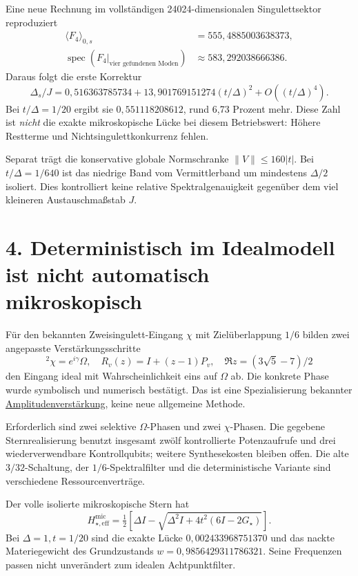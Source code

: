 \documentclass[11pt,a4paper,oneside,parskip=half,headings=normal]{scrreprt}
\newcommand{\spec}{\operatorname{spec}}
\begin{document}
Eine neue Rechnung im vollständigen 24024-dimensionalen Singulettsektor reproduziert
\begin{align}
\langle F_4\rangle_{0,s}&=555{,}4885003638373,\\
\spec(F_4|_{\text{vier gefundenen Moden}})
&\approx583{,}292038666386.
\end{align}
Daraus folgt die erste Korrektur
\begin{equation}
\Delta_s/J=0{,}516363785734+
13{,}901769151274(t/\Delta)^2+O((t/\Delta)^4).
\end{equation}
Bei $t/\Delta=1/20$ ergibt sie $0{,}551118208612$, rund 6,73 Prozent mehr. Diese Zahl ist \emph{nicht} die exakte mikroskopische Lücke bei diesem Betriebswert: Höhere Restterme und Nichtsingulettkonkurrenz fehlen.

Separat trägt die konservative globale Normschranke $\|V\|\le160|t|$. Bei $t/\Delta=1/640$ ist das niedrige Band vom Vermittlerband um mindestens $\Delta/2$ isoliert. Dies kontrolliert keine relative Spektralgenauigkeit gegenüber dem viel kleineren Austauschmaßstab $J$.

\section*{4. Deterministisch im Idealmodell ist nicht automatisch mikroskopisch}
Für den bekannten Zweisingulett-Eingang $\chi$ mit Zielüberlappung $1/6$ bilden zwei angepasste Verstärkungsschritte
\begin{equation}
[R_\chi(z)R_\Omega(z)]^2\chi=e^{i\gamma}\Omega,\quad
R_v(z)=I+(z-1)P_v,\quad \Re z=(3\sqrt5-7)/2
\end{equation}
den Eingang ideal mit Wahrscheinlichkeit eins auf $\Omega$ ab. Die konkrete Phase wurde symbolisch und numerisch bestätigt. Das ist eine Spezialisierung bekannter \href{https://arxiv.org/abs/quant-ph/0005055}{Amplitudenverstärkung}, keine neue allgemeine Methode.

Erforderlich sind zwei selektive $\Omega$-Phasen und zwei $\chi$-Phasen. Die gegebene Sternrealisierung benutzt insgesamt zwölf kontrollierte Potenzaufrufe und drei wiederverwendbare Kontrollqubits; weitere Synthesekosten bleiben offen. Die alte $3/32$-Schaltung, der $1/6$-Spektralfilter und die deterministische Variante sind verschiedene Ressourcenverträge.

Der volle isolierte mikroskopische Stern hat
\begin{equation}
H_{\star,\mathrm{eff}}^{\mathrm{mic}}
=\tfrac12[\Delta I-\sqrt{\Delta^2I+4t^2(6I-2G_\star)}].
\end{equation}
Bei $\Delta=1,t=1/20$ sind die exakte Lücke $0{,}002433968751370$ und das nackte Materiegewicht des Grundzustands $w=0{,}9856429311786321$. Seine Frequenzen passen nicht unverändert zum idealen Achtpunktfilter.
\end{document}
